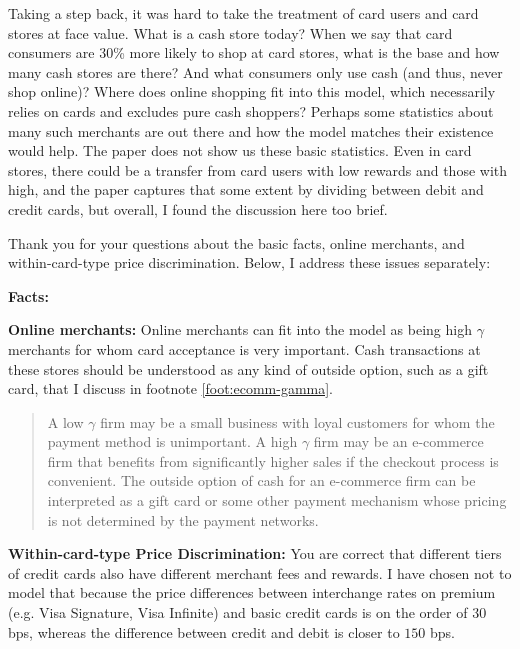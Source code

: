 \documentclass[main.tex]{subfiles}
\begin{document}
\begin{refsection}
\replysorting

\begin{refcomment}
Taking a step back, it was hard to take the treatment of card users and card stores at face value.
What is a cash store today?
When we say that card consumers are 30\% more likely to shop at card stores, what is the base and how many cash stores are there?
And what consumers only use cash (and thus, never shop online)?
Where does online shopping fit into this model, which necessarily relies on cards and excludes pure cash shoppers?
Perhaps some statistics about many such merchants are out there and how the model matches their existence would help.
The paper does not show us these basic statistics.
Even in card stores, there could be a transfer from card users with low rewards and those with high, and the paper captures that some extent by dividing between debit and credit cards, but overall, I found the discussion here too brief.
\end{refcomment}

Thank you for your questions about the basic facts, online merchants, and within-card-type price discrimination.
Below, I address these issues separately:

\textbf{Facts: } \replyfacts

\textbf{Online merchants: } Online merchants can fit into the model as being high $\gamma$ merchants for whom card acceptance is very important.
Cash transactions at these stores should be understood as any kind of outside option, such as a gift card, that I discuss in footnote \ref{foot:ecomm-gamma}.

\begin{quotation}
    A low $\gamma$ firm may be a small business with loyal customers for whom the payment method is unimportant.
A high $\gamma$ firm may be an e-commerce firm that benefits from significantly higher sales if the checkout process is convenient.
The outside option of cash for an e-commerce firm can be interpreted as a gift card or some other payment mechanism whose pricing is not determined by the payment networks.
\end{quotation}

\textbf{Within-card-type Price Discrimination:} You are correct that different tiers of credit cards also have different merchant fees and rewards.
I have chosen not to model that because the price differences between interchange rates on premium (e.g. Visa Signature, Visa Infinite) and basic credit cards is on the order of $30$ bps, whereas the difference between credit and debit is closer to $150$ bps.


\end{refsection}
\end{document}
